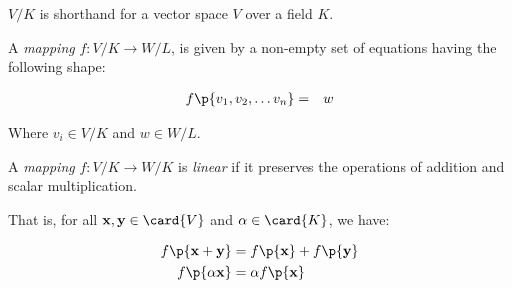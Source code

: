 \begin{notation}
$V/K$ is shorthand for a vector space $V$ over a field $K$.
\end{notation}

\begin{definition}[Map]

A \emph{mapping} $f: V/K \rightarrow W/L$, is given by a non-empty set of
equations having the following shape:

\begin{eqnarray}
f\p{v_1, v_2, \ldots v_n} &=& w
\end{eqnarray}

Where $v_i \in V/K$ and $w \in W/L$.

\end{definition}

\begin{definition}

A \emph{mapping} $f: V/K \rightarrow W/K$ is \emph{linear} if it preserves the
operations of addition and scalar multiplication.

That is, for all $\mathbf{x}, \mathbf{y} \in \card{V}$ and $\alpha \in
\card{K}$, we have:

\begin{align}
f\p{\mathbf{x}+\mathbf{y}} &= f\p{\mathbf{x}} + f\p{\mathbf{y}}\\
f\p{\alpha \mathbf{x}} &= \alpha f\p{\mathbf{x}}
\end{align}

\end{definition}
